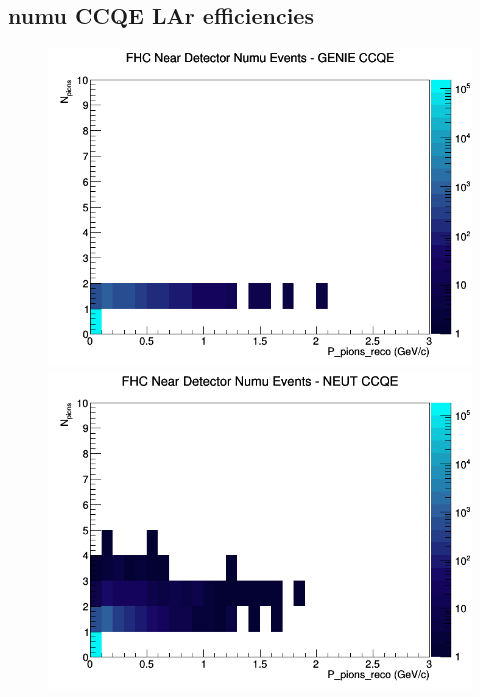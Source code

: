 \documentclass[12pt]{article}
\begin{document}
\subsection{numu CCQE LAr efficiencies}
\begin{figure}[h]
\includegraphics[width=\linewidth]{eff_N_P/LAr/pions/CCQE_FHC_ND_numu_N_P_GENIE.png}
\endminipage
{}
\includegraphics[width=\linewidth]{eff_N_P/LAr/pions/CCQE_FHC_ND_numu_N_P_NEUT.png}
\endminipage
{}

\end{figure}
\end{document}
